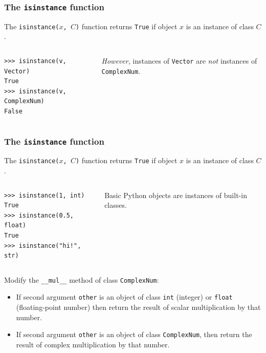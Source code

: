\documentclass[english,serif,mathserif,xcolor=pdftex,dvipsnames,table]{beamer}
\begin{document}
\begin{frame}[fragile]
  \frametitle{The \texttt{isinstance} function}
  The \texttt{isinstance($x$, $C$)} function returns \texttt{True} if
  object $x$ is an instance of class $C$.

  \+
  \begin{columns}
    \begin{column}{0.5\textwidth}
\begin{lstlisting}
>>> isinstance(v, Vector)
True
>>> isinstance(v, ComplexNum)
False
\end{lstlisting}
    \end{column}
    \begin{column}{0.5\textwidth}
      \raggedleft
      \emph{However,} instances of \texttt{Vector} are \emph{not}
      instances of \texttt{ComplexNum}.
    \end{column}
  \end{columns}
\end{frame}


\begin{frame}[fragile]
  \frametitle{The \texttt{isinstance} function}
  The \texttt{isinstance($x$, $C$)} function returns \texttt{True} if
  object $x$ is an instance of class $C$.

  \+
  \begin{columns}
    \begin{column}{0.5\textwidth}
\begin{lstlisting}
>>> isinstance(1, int)
True
>>> isinstance(0.5, float)
True
>>> isinstance("hi!", str)
\end{lstlisting}
    \end{column}
    \begin{column}{0.5\textwidth}
      \raggedleft
      Basic Python objects are instances of built-in classes.
    \end{column}
  \end{columns}
\end{frame}


\begin{frame}[fragile]
  \begin{exercise}
    Modify the \lstinline|__mul__| method of class \texttt{ComplexNum}:
    \begin{itemize}
    \item If second argument \texttt{other} is an object of class
      \texttt{int} (integer) or \texttt{float} (floating-point
      number) then return the result of scalar multiplication by that number.
    \item If second argument \texttt{other} is an object of class
      \texttt{ComplexNum}, then return the result of complex
      multiplication by that number.
    \end{itemize}
  \end{exercise}
\end{frame}
\end{document}
